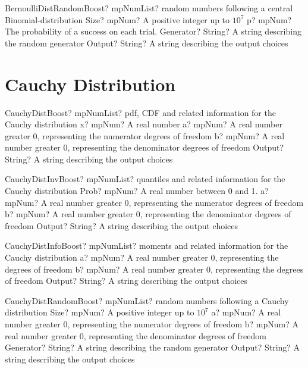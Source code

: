 \documentclass[12pt,a4paper,openany]{book}
\begin{document}
\begin{mpFunctionsExtract}
\mpFunctionFourNotImplemented
{BernoulliDistRandomBoost? mpNumList? random numbers following a central Binomial-distribution}
{Size? mpNum? A positive integer up to $10^7$}
{p? mpNum? The probability of a success on each trial.}
{Generator? String? A string describing the random generator}
{Output? String? A string describing the output choices}
\end{mpFunctionsExtract}

\section{Cauchy Distribution}

\begin{mpFunctionsExtract}
\mpFunctionFourNotImplemented
{CauchyDistBoost? mpNumList? pdf, CDF and related information for the Cauchy distribution}
{x? mpNum? A real number}
{a? mpNum? A real number greater 0, representing the numerator  degrees of freedom}
{b? mpNum? A real number greater 0, representing the denominator degrees of freedom}
{Output? String? A string describing the output choices}
\end{mpFunctionsExtract}

\begin{mpFunctionsExtract}
\mpFunctionFourNotImplemented
{CauchyDistInvBoost? mpNumList? quantiles and related information for the Cauchy distribution}
{Prob? mpNum? A real number between 0 and 1.}
{a? mpNum? A real number greater 0, representing the numerator  degrees of freedom}
{b? mpNum? A real number greater 0, representing the denominator degrees of freedom}
{Output? String? A string describing the output choices}
\end{mpFunctionsExtract}

\begin{mpFunctionsExtract}
\mpFunctionThreeNotImplemented
{CauchyDistInfoBoost? mpNumList? moments and related information for the Cauchy distribution}
{a? mpNum? A real number greater 0, representing the degrees of freedom}
{b? mpNum? A real number greater 0, representing the degrees of freedom}
{Output? String? A string describing the output choices}
\end{mpFunctionsExtract}

\begin{mpFunctionsExtract}
\mpFunctionFiveNotImplemented
{CauchyDistRandomBoost? mpNumList? random numbers following a Cauchy distribution}
{Size? mpNum? A positive integer up to $10^7$}
{a? mpNum? A real number greater 0, representing the numerator  degrees of freedom}
{b? mpNum? A real number greater 0, representing the denominator degrees of freedom}
{Generator? String? A string describing the random generator}
{Output? String? A string describing the output choices}
\end{mpFunctionsExtract}
\end{document}
